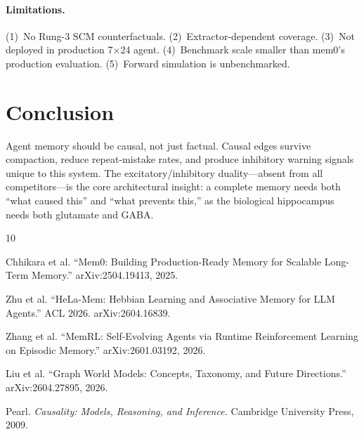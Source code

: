 \documentclass[letterpaper,twocolumn,10pt]{article}
\begin{document}
\paragraph{Limitations.}
(1)~No Rung-3 SCM counterfactuals. (2)~Extractor-dependent coverage. (3)~Not deployed in production 7$\times$24 agent. (4)~Benchmark scale smaller than mem0's production evaluation. (5)~Forward simulation is unbenchmarked.

\section{Conclusion}
\label{sec:conclusion}

Agent memory should be causal, not just factual. Causal edges survive compaction, reduce repeat-mistake rates, and produce inhibitory warning signals unique to this system. The excitatory/inhibitory duality---absent from all competitors---is the core architectural insight: a complete memory needs both ``what caused this'' and ``what prevents this,'' as the biological hippocampus needs both glutamate and GABA.


\begin{thebibliography}{10}

Chhikara et al. ``Mem0: Building Production-Ready Memory for Scalable Long-Term Memory.'' arXiv:2504.19413, 2025.

Zhu et al. ``HeLa-Mem: Hebbian Learning and Associative Memory for LLM Agents.'' ACL 2026. arXiv:2604.16839.

Zhang et al. ``MemRL: Self-Evolving Agents via Runtime Reinforcement Learning on Episodic Memory.'' arXiv:2601.03192, 2026.

Liu et al. ``Graph World Models: Concepts, Taxonomy, and Future Directions.'' arXiv:2604.27895, 2026.

Pearl. \emph{Causality: Models, Reasoning, and Inference.} Cambridge University Press, 2009.

\end{thebibliography}
\end{document}
